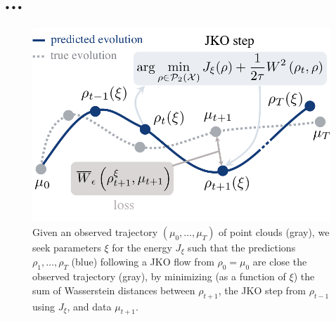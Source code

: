 \chapter{...}
\label{cha:neural_pde}



\begin{figure}[t]
    \centering
    \includegraphics[width=.9\linewidth]{figures/fig_overview_jkonet.pdf}
    \caption{Given an observed trajectory $(\mu_0,\dots,\mu_T)$ of point clouds (gray), we seek parameters $\xi$ for the energy $J_\xi$ such that the predictions $\rho_1, \dots, \rho_T$ (blue) following a JKO flow from $\rho_0=\mu_0$ are close the observed trajectory (gray), by minimizing (as a function of $\xi$) the sum of Wasserstein distances between $\rho_{t+1}$, the JKO step from $\rho_{t-1}$ using $J_\xi$, and data $\mu_{t+1}$.}
    \label{fig:overview}
\end{figure}

